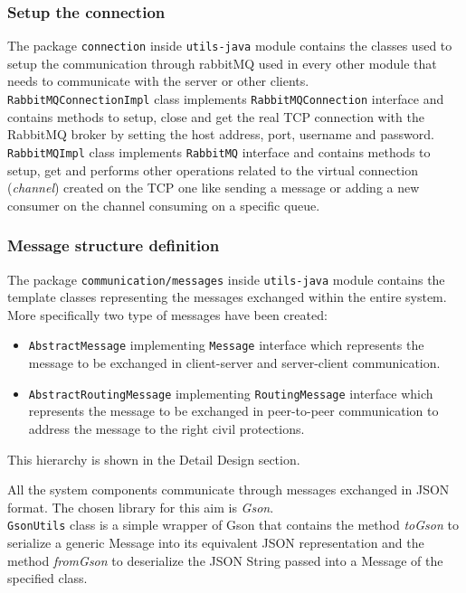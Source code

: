 \documentclass[a4paper,12pt]{report}
\begin{document}
\subsubsection{Setup the connection}
The package \texttt{connection} inside \texttt{utils-java} module contains the classes used to setup the communication through rabbitMQ used in every other module that needs to communicate with the server or other clients.
\\\texttt{RabbitMQConnectionImpl} class implements \texttt{RabbitMQConnection} interface and contains methods to setup, close and get the real TCP connection with the RabbitMQ broker by setting the host address, port, username and password. 
\\\texttt{RabbitMQImpl} class implements \texttt{RabbitMQ} interface and contains methods to setup, get and performs other operations related to the virtual connection (\textit{channel}) created on the TCP one like sending a message or adding a new consumer on the channel consuming on a specific queue.

\subsubsection{Message structure definition}
The package \texttt{communication/messages} inside \texttt{utils-java} module contains the template classes representing the messages exchanged within the entire system.
More specifically two type of messages have been created:
\begin{itemize}
\item \texttt{AbstractMessage} implementing \texttt{Message} interface which represents the message to be exchanged in client-server and server-client communication. 
\item \texttt{AbstractRoutingMessage} implementing \texttt{RoutingMessage} interface which represents the message to be exchanged in peer-to-peer communication to address the message to the right civil protections. 
\end{itemize}
This hierarchy is shown in the Detail Design section.

All the system components communicate through messages exchanged in JSON format. The chosen library for this aim is \textit{Gson}. \\
\texttt{GsonUtils} class is a simple wrapper of Gson that contains the method \textit{toGson} to serialize a generic Message into its equivalent JSON representation and the method \textit{fromGson} to deserialize the JSON String passed into a Message of the specified class.
\end{document}
